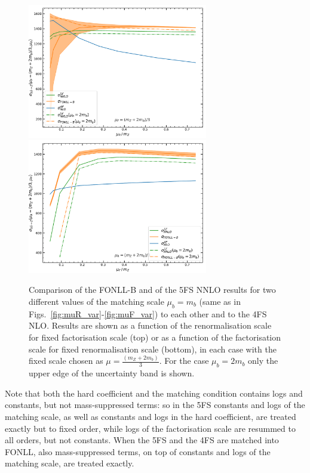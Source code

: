 \documentclass[12pt]{article}
\begin{document}
\begin{figure}
  \begin{center}
    \includegraphics[width=0.7\textwidth]{m_muR_var.pdf}
    \includegraphics[width=0.7\textwidth]{m_muF_var.pdf} 
    \caption{\label{fig:m_mu_var} 
      Comparison of the FONLL-B  and of the 5FS NNLO results for two different
      values of the matching scale $\mu_b=m_b$ (same as in
      Figs.~\ref{fig:muR_var}-\ref{fig:muF_var}) to each other and to the
      4FS NLO. Results are shown as a function of the renormalisation scale
      for fixed factorisation scale (top) or as a function of the
      factorisation scale for fixed renormalisation scale (bottom), in each
      case with the fixed scale chosen as
      $\mu=\frac{(m_Z+2m_b)}{3}$. For the case $\mu_b=2m_b$ only the
      upper edge of the uncertainty band is shown.}
  \end{center}
\end{figure}

Note that both the
hard coefficient and the
matching condition contains logs and constants, but not
mass-suppressed terms: so in the 5FS constants and logs of the
matching scale, as well as constants and logs in the hard
coefficient, 
are treated exactly but to fixed order, while logs of the
factorisation scale are  resummed to all
orders, but not constants. 
When the 5FS and the 4FS are matched into FONLL, also 
mass-suppressed terms, on top of constants
and logs of the matching scale, are treated
exactly.
\end{document}
